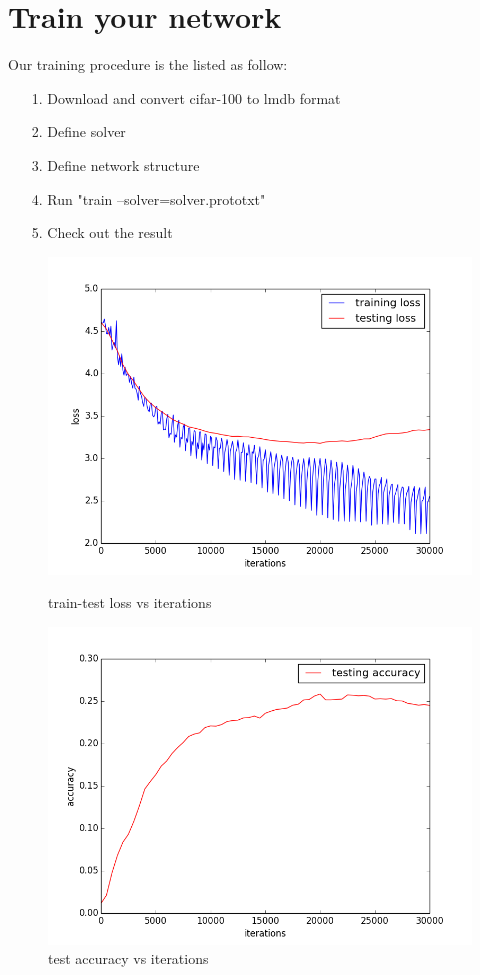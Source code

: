 \documentclass{article} %
\begin{document}
\section{Train your network}
Our training procedure is the listed as follow:
\begin{itemize}
    \item [1.]Download and convert cifar-100 to lmdb format
    \item [2.]Define solver
    \item [3.]Define network structure
    \item [4.]Run "train --solver=solver.prototxt"
    \item [5.]Check out the result
\end{itemize}
\begin{figure}[H]
    \begin{minipage}{0.5\linewidth}
        \centering
        \includegraphics[scale=0.35]{origin_loss.png}
        \caption{train-test loss vs iterations}
    \end{minipage}
    \begin{minipage}{0.5\linewidth}
        \centering
        \includegraphics[scale=0.35]{origin_test_ac.png}
     \caption{test accuracy vs iterations}
    \end{minipage}
\end{figure}
\end{document}
